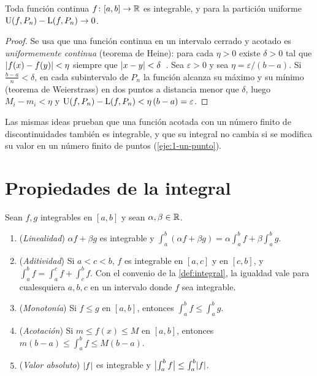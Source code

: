 \begin{teorema}\label{teo:continua}
Toda función continua $f\colon[a,b]\to\mathbb{R}$ es integrable, y para la partición uniforme $\operatorname{U}(f,P_n)-\operatorname{L}(f,P_n)\to0$.
\end{teorema}

\begin{proof}
Se usa que una función continua en un intervalo cerrado y acotado es \emph{uniformemente continua} (teorema de Heine): para cada $\eta>0$ existe $\delta>0$ tal que $\lvert f(x)-f(y)\rvert<\eta$ siempre que $\lvert x-y\rvert<\delta$~\cite[cap.~13]{spivak}. Sea $\varepsilon>0$ y sea $\eta=\varepsilon/(b-a)$. Si $\frac{b-a}{n}<\delta$, en cada subintervalo de $P_n$ la función alcanza su máximo y su mínimo (teorema de Weierstrass) en dos puntos a distancia menor que $\delta$, luego $M_i-m_i<\eta$ y $\operatorname{U}(f,P_n)-\operatorname{L}(f,P_n)<\eta\,(b-a)=\varepsilon$.
\end{proof}

Las mismas ideas prueban que una función acotada con un número finito de discontinuidades también es integrable, y que su integral no cambia si se modifica su valor en un número finito de puntos (\cref{eje:1-un-punto}).

\section{Propiedades de la integral}

\begin{teorema}\label{teo:propiedades}
Sean $f,g$ integrables en $[a,b]$ y sean $\alpha,\beta\in\mathbb{R}$.
\begin{enumerate}
  \item (\emph{Linealidad}) $\alpha f+\beta g$ es integrable y $\int_a^b(\alpha f+\beta g)=\alpha\int_a^b f+\beta\int_a^b g$.
  \item (\emph{Aditividad}) Si $a<c<b$, $f$ es integrable en $[a,c]$ y en $[c,b]$, y $\int_a^b f=\int_a^c f+\int_c^b f$. Con el convenio de la \cref{def:integral}, la igualdad vale para cualesquiera $a,b,c$ en un intervalo donde $f$ sea integrable.
  \item (\emph{Monotonía}) Si $f\le g$ en $[a,b]$, entonces $\int_a^b f\le\int_a^b g$.
  \item (\emph{Acotación}) Si $m\le f(x)\le M$ en $[a,b]$, entonces $m(b-a)\le\int_a^b f\le M(b-a)$.
  \item (\emph{Valor absoluto}) $\lvert f\rvert$ es integrable y $\bigl|\int_a^b f\bigr|\le\int_a^b\lvert f\rvert$.
\end{enumerate}
\end{teorema}

